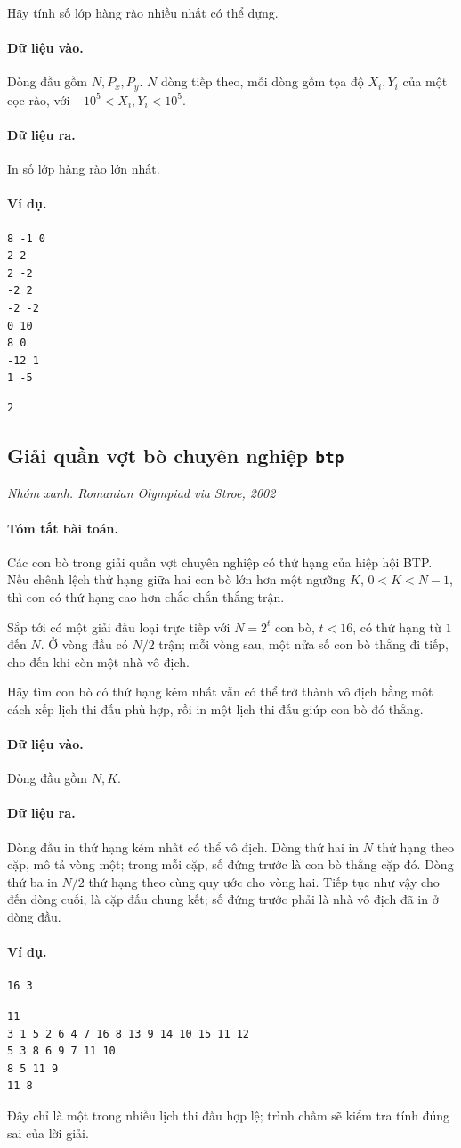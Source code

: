 \documentclass[11pt]{article}
\newcommand{\problem}[4]{%
  \subsection[#1 (#2)]{#1 \hfill {\normalsize\texttt{#2}}}%
  \noindent\textit{#3. #4}\par\smallskip
}
\newcommand{\iosec}[1]{\paragraph{#1}}
\begin{document}
Hãy tính số lớp hàng rào nhiều nhất có thể dựng.

\iosec{Dữ liệu vào.}
Dòng đầu gồm \(N,P_x,P_y\). \(N\) dòng tiếp theo, mỗi dòng gồm tọa độ
\(X_i,Y_i\) của một cọc rào, với \(-10^5<X_i,Y_i<10^5\).

\iosec{Dữ liệu ra.}
In số lớp hàng rào lớn nhất.

\iosec{Ví dụ.}
\begin{verbatim}
8 -1 0
2 2
2 -2
-2 2
-2 -2
0 10
8 0
-12 1
1 -5
\end{verbatim}

\begin{verbatim}
2
\end{verbatim}

\problem{Giải quần vợt bò chuyên nghiệp}{btp}{Nhóm xanh}{Romanian Olympiad via Stroe, 2002}

\iosec{Tóm tắt bài toán.}
Các con bò trong giải quần vợt chuyên nghiệp có thứ hạng của hiệp hội BTP.
Nếu chênh lệch thứ hạng giữa hai con bò lớn hơn một ngưỡng \(K\),
\(0<K<N-1\), thì con có thứ hạng cao hơn chắc chắn thắng trận.

Sắp tới có một giải đấu loại trực tiếp với \(N=2^t\) con bò, \(t<16\), có thứ
hạng từ \(1\) đến \(N\). Ở vòng đầu có \(N/2\) trận; mỗi vòng sau, một nửa số
con bò thắng đi tiếp, cho đến khi còn một nhà vô địch.

Hãy tìm con bò có thứ hạng kém nhất vẫn có thể trở thành vô địch bằng một
cách xếp lịch thi đấu phù hợp, rồi in một lịch thi đấu giúp con bò đó thắng.

\iosec{Dữ liệu vào.}
Dòng đầu gồm \(N,K\).

\iosec{Dữ liệu ra.}
Dòng đầu in thứ hạng kém nhất có thể vô địch. Dòng thứ hai in \(N\) thứ hạng
theo cặp, mô tả vòng một; trong mỗi cặp, số đứng trước là con bò thắng cặp đó.
Dòng thứ ba in \(N/2\) thứ hạng theo cùng quy ước cho vòng hai. Tiếp tục như
vậy cho đến dòng cuối, là cặp đấu chung kết; số đứng trước phải là nhà vô địch
đã in ở dòng đầu.

\iosec{Ví dụ.}
\begin{verbatim}
16 3
\end{verbatim}

\begin{verbatim}
11
3 1 5 2 6 4 7 16 8 13 9 14 10 15 11 12
5 3 8 6 9 7 11 10
8 5 11 9
11 8
\end{verbatim}

Đây chỉ là một trong nhiều lịch thi đấu hợp lệ; trình chấm sẽ kiểm tra tính
đúng sai của lời giải.
\end{document}
